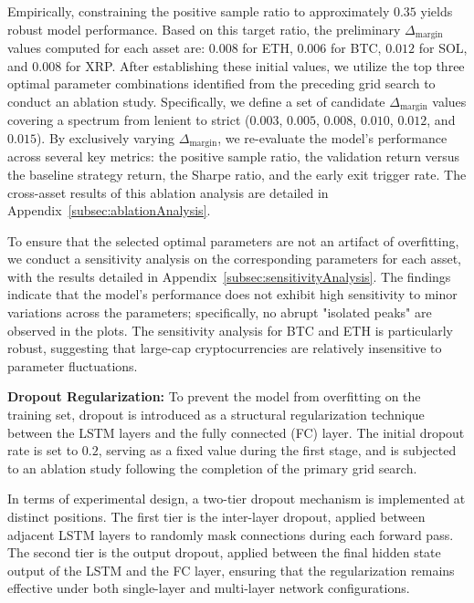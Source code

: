 \documentclass[12pt]{article}
\begin{document}
Empirically, constraining the positive sample ratio to approximately $0.35$ yields robust model performance. Based on this target ratio, the preliminary $\Delta_{\text{margin}}$ values computed for each asset are: $0.008$ for ETH, $0.006$ for BTC, $0.012$ for SOL, and $0.008$ for XRP. After establishing these initial values, we utilize the top three optimal parameter combinations identified from the preceding grid search to conduct an ablation study. Specifically, we define a set of candidate $\Delta_{\text{margin}}$ values covering a spectrum from lenient to strict ($0.003$, $0.005$, $0.008$, $0.010$, $0.012$, and $0.015$). By exclusively varying $\Delta_{\text{margin}}$, we re-evaluate the model's performance across several key metrics: the positive sample ratio, the validation return versus the baseline strategy return, the Sharpe ratio, and the early exit trigger rate. The cross-asset results of this ablation analysis are detailed in Appendix~\ref{subsec:ablationAnalysis}.

To ensure that the selected optimal parameters are not an artifact of overfitting, we conduct a sensitivity analysis on the corresponding parameters for each asset, with the results detailed in Appendix~\ref{subsec:sensitivityAnalysis}. The findings indicate that the model's performance does not exhibit high sensitivity to minor variations across the parameters; specifically, no abrupt "isolated peaks" are observed in the plots. The sensitivity analysis for BTC and ETH is particularly robust, suggesting that large-cap cryptocurrencies are relatively insensitive to parameter fluctuations.

\textbf{Dropout Regularization:} To prevent the model from overfitting on the training set, dropout is introduced as a structural regularization technique between the LSTM layers and the fully connected (FC) layer. The initial dropout rate is set to $0.2$, serving as a fixed value during the first stage, and is subjected to an ablation study following the completion of the primary grid search.

In terms of experimental design, a two-tier dropout mechanism is implemented at distinct positions. The first tier is the inter-layer dropout, applied between adjacent LSTM layers to randomly mask connections during each forward pass. The second tier is the output dropout, applied between the final hidden state output of the LSTM and the FC layer, ensuring that the regularization remains effective under both single-layer and multi-layer network configurations.
\end{document}
